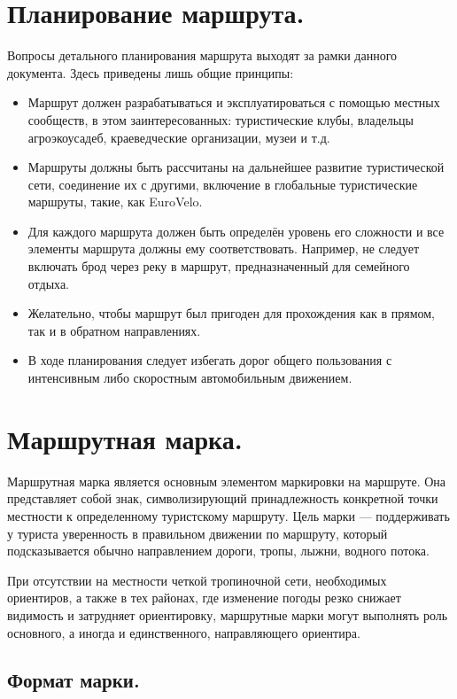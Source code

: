 \documentclass[a4paper,12pt,titlepage]{extarticle}
\begin{document}
\section{Планирование маршрута.}

Вопросы детального планирования маршрута выходят за рамки данного документа. Здесь приведены лишь общие принципы:
\begin{itemize}
	\item Маршрут должен разрабатываться и эксплуатироваться с помощью местных сообществ, в этом заинтересованных:
		туристические клубы, владельцы агроэкоусадеб, краеведческие организации, музеи и т.д.
	\item Маршруты должны быть рассчитаны на дальнейшее развитие туристической сети, соединение их с другими,
		включение в глобальные туристические маршруты, такие, как EuroVelo.
	\item Для каждого маршрута должен быть определён уровень его сложности и все элементы маршрута должны ему
		соответствовать. Например, не следует включать брод через реку в маршрут, предназначенный для семейного
		отдыха.
	\item Желательно, чтобы маршрут был пригоден для прохождения как в прямом, так и в обратном направлениях.
	\item В ходе планирования следует избегать дорог общего пользования с интенсивным либо скоростным автомобильным
		движением.
\end{itemize}


\section{Маршрутная марка.}

Маршрутная марка является основным элементом маркировки на маршруте. Она представляет собой знак, символизирующий
принадлежность конкретной точки местности к определенному туристскому маршруту. Цель марки --- поддерживать у туриста
уверенность в правильном движении по маршруту, который подсказывается обычно направлением дороги, тропы, лыжни, водного
потока.

При отсутствии на местности четкой тропиночной сети, необходимых ориентиров, а также в тех районах, где изменение погоды
резко снижает видимость и затрудняет ориентировку, маршрутные марки могут выполнять роль основного, а иногда и
единственного, направляющего ориентира.

\subsection{Формат марки.}
\end{document}
